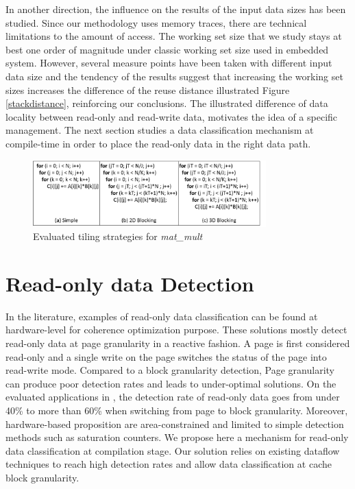 \documentclass[sigconf]{acmart}
\begin{document}
In another direction, the influence on the results of the input data sizes has been studied. Since our methodology uses memory traces, there are technical limitations to the amount of access. The working set size that we study stays at best one order of magnitude under classic working set size used in embedded system. However, several measure points have been taken with different input data size and the tendency of the results suggest that increasing the working set sizes increases the difference of the reuse distance illustrated Figure \ref{stackdistance}, reinforcing our conclusions. The illustrated difference of data locality between read-only and read-write data, motivates the idea of a specific management. The next section studies a data classification mechanism at compile-time in order to place the read-only data in the right data path. 

\begin{figure}
    \centering
    \includegraphics[width=9cm]{./images/matmul.png}
     \caption{Evaluated tiling strategies for \textit{mat\_mult}}
    \label{matmul}
\end{figure}


\section{Read-only data Detection}

In the literature, examples\cite{Cuesta:2013}\cite{Pugsley:2010} of read-only data classification can be found at hardware-level for coherence optimization purpose. These solutions mostly detect read-only data at page granularity in a reactive fashion. A page is first considered read-only and a single write on the page switches the status of the page into read-write mode. Compared to a block granularity detection, Page granularity can produce poor detection rates and leads to under-optimal solutions. On the evaluated applications in \cite{Cuesta:2013}, the detection rate of read-only data goes from under 40\% to more than 60\% when switching from page to block granularity. Moreover, hardware-based proposition are area-constrained and limited to simple detection methods such as saturation counters. We propose here a mechanism for read-only data classification at compilation stage. Our solution relies on existing dataflow techniques to reach high detection rates and allow data classification at cache block granularity. 
\end{document}
